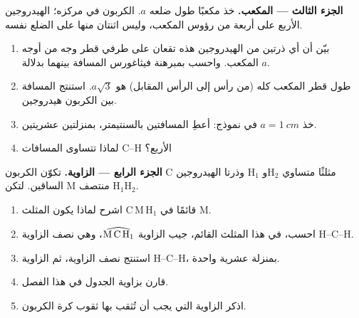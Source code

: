 \begin{problem}
\medskip
\noindent\textbf{الجزء الثالث --- المكعب.}
خذ مكعبًا طول ضلعه $a$.  الكربون في مركزه؛  الهيدروجين الأربع على
أربعة من رؤوس المكعب، وليس اثنتان منها على الضلع نفسه.
\begin{enumerate}[resume]
  \item بيّن أن أي ذرتين من  الهيدروجين هذه تقعان على طرفي قطر وجه
        من أوجه المكعب. واحسب بمبرهنة فيثاغورس المسافة بينهما بدلالة
        $a$.
  \item طول قطر المكعب كله (من رأس إلى الرأس المقابل) هو
        $a\sqrt{3}$. استنتج المسافة بين  الكربون 
        هيدروجين.
  \item خذ $a = \qty{1}{cm}$ في نموذج: أعطِ المسافتين بالسنتيمتر، بمنزلتين
        عشريتين.
  \item لماذا تتساوى المسافات C--H الأربع؟
\end{enumerate}

\medskip
\noindent\textbf{الجزء الرابع --- الزاوية.}
تكوّن  الكربون C وذرتا الهيدروجين H$_1$ وH$_2$ مثلثًا متساوي
الساقين. لتكن M منتصف H$_1$H$_2$.
\begin{enumerate}[resume]
  \item اشرح لماذا يكون المثلث C\,M\,H$_1$ قائمًا في M.
  \item احسب، في هذا المثلث القائم، جيب الزاوية
        $\widehat{\text{M\,C\,H}_1}$، وهي نصف الزاوية H--C--H.
  \item استنتج نصف الزاوية، ثم الزاوية H--C--H، بمنزلة عشرية
        واحدة.
  \item قارن بزاوية الجدول في هذا الفصل.
  \item اذكر الزاوية التي يجب أن تُثقب بها ثقوب كرة
        الكربون.
\end{enumerate}
\end{problem}
